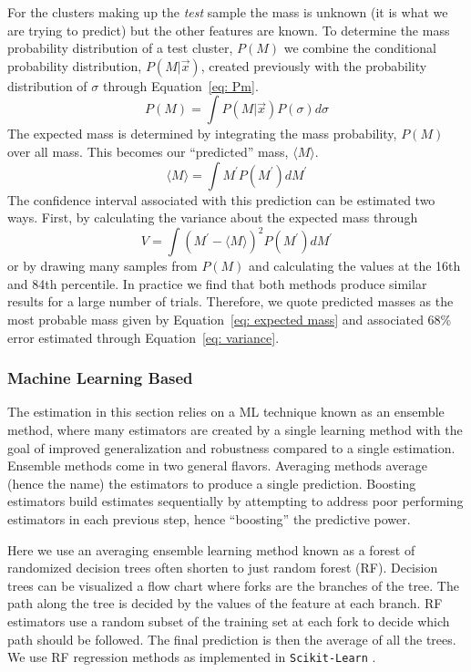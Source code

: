 \documentclass[fleqn,usenatbib]{mnras}
\begin{document}
For the clusters making up the \emph{test} sample the mass is unknown (it is what we are trying to predict) but the other features are known. To determine the mass probability distribution of a test cluster, $P(M)$ we combine the conditional probability distribution, $P(M|\vec{x})$, created previously with the probability distribution of $\sigma$ through Equation~\ref{eq: Pm}.
\begin{equation}\label{eq: Pm}
	P(M) = \int P(M|\vec{x}) P(\sigma) d\sigma
\end{equation}
The expected mass is determined by integrating the mass probability, $P(M)$ over all mass. This becomes our ``predicted'' mass, $\langle M\rangle$.
\begin{equation}\label{eq: expected mass}
	\langle M\rangle = \int M^\prime P(M^\prime)dM^\prime
\end{equation}
The confidence interval associated with this prediction can be estimated two ways. First, by calculating the variance about the expected mass through
\begin{equation}\label{eq: variance}
	V = \int (M^\prime - \langle M\rangle)^2 P(M^\prime)dM^\prime
\end{equation}
or by drawing many samples from $P(M)$ and calculating the values at the 16th and 84th percentile. In practice we find that both methods produce similar results for a large number of trials. Therefore, we quote predicted masses as the most probable mass given by Equation~\ref{eq: expected mass} and associated 68\% error estimated through Equation~\ref{eq: variance}.

\subsubsection{Machine Learning Based}\label{sec:machine learning method}
The estimation in this section relies on a ML technique known as an ensemble method, where many estimators are created by a single learning method with the goal of improved generalization and robustness compared to a single estimation. Ensemble methods come in two general flavors. Averaging methods average (hence the name) the estimators to produce a single prediction. Boosting estimators build estimates sequentially by attempting to address poor performing estimators in each previous step, hence ``boosting'' the predictive power.

Here we use an averaging ensemble learning method known as a forest of randomized decision trees often shorten to just random forest (RF). Decision trees can be visualized a flow chart where forks are the branches of the tree. The path along the tree is decided by the values of the feature at each branch. RF estimators use a random subset of the training set at each fork to decide which path should be followed. The final prediction is then the average of all the trees. We use RF regression methods as implemented in {\tt Scikit-Learn} \citep{Pedregosa2012}.
\end{document}
